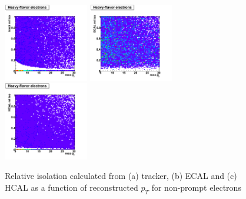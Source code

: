  \begin{figure}[htbp]
    \includegraphics[width = 0.33\textwidth]{pictures/recoPt_relIso/trackIso_elec_nonPrompt.png}
    \includegraphics[width = 0.33\textwidth]{pictures/recoPt_relIso/ecalIso_elec_nonPrompt.png}
    \includegraphics[width = 0.33\textwidth]{pictures/recoPt_relIso/hcalIso_elec_nonPrompt.png}
    \caption{Relative isolation calculated from (a) tracker, (b) ECAL and (c) HCAL as a function of
       reconstructed $p_{T}$ for non-prompt electrons}
    \label{fig:NonPromptElecRecoPt_RelIso}
 \end{figure}

 \clearpage

